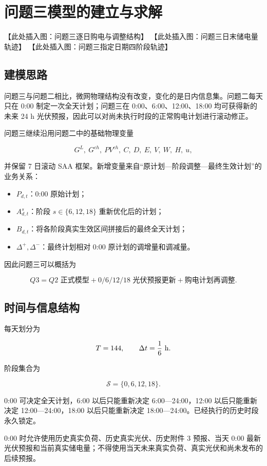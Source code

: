 \section{问题三模型的建立与求解}
【此处插入图：问题三逐日购电与调整结构】
【此处插入图：问题三日末储电量轨迹】
【此处插入图：问题三指定日期四阶段轨迹】

\subsection{建模思路}

问题三与问题二相比，微网物理结构没有改变，变化的是日内信息集。问题二每天只在 0:00 制定一次全天计划；问题三在 0:00、6:00、12:00、18:00 均可获得新的未来 24 h 光伏预报，因此可以对尚未执行时段的正常购电计划进行滚动修正。

问题三继续沿用问题二中的基础物理变量

\[
G^L,\ G^{ch},\ PV^{ch},\ C,\ D,\ E,\ V,\ W,\ H,\ u,
\]

并保留 7 日滚动 SAA 框架。新增变量来自“原计划—阶段调整—最终生效计划”的业务关系：

\begin{itemize}
\item \(P_{d,t}\)：0:00 原始计划；
\item \(A^s_{d,t}\)：阶段 \(s\in\{6,12,18\}\) 重新优化后的计划；
\item \(B_{d,t}\)：将各阶段真实生效区间拼接后的最终全天计划；
\item \(\Delta^+,\Delta^-\)：最终计划相对 0:00 原计划的调增量和调减量。
\end{itemize}

因此问题三可以概括为

\[
\boxed{
Q3
=
Q2\text{ 正式模型}
+
0/6/12/18\text{ 光伏预报更新}
+
\text{购电计划再调整}
}.
\]

\subsection{时间与信息结构}

每天划分为

\[
T=144,
\qquad
\Delta t=\frac16\ {\rm h}.
\]

阶段集合为

\[
\mathcal S=\{0,6,12,18\}.
\]

0:00 可决定全天计划，6:00 以后只能重新决定 6:00—24:00，12:00 以后只能重新决定 12:00—24:00，18:00 以后只能重新决定 18:00—24:00。已经执行的历史时段永久锁定。

0:00 时允许使用历史真实负荷、历史真实光伏、历史附件 3 预报、当天 0:00 最新光伏预报和当前真实储电量；不得使用当天未来真实负荷、真实光伏和尚未发布的后续预报。

